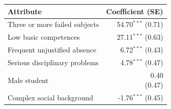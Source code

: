\begin{tabular}{lr}
\toprule
Attribute & Coefficient (SE) \\
\midrule
Three or more failed subjects & \shortstack{54.70$^{***}$\\{\scriptsize (0.71)}} \\
Low basic competences & \shortstack{27.11$^{***}$\\{\scriptsize (0.63)}} \\
Frequent unjustified absence & \shortstack{6.72$^{***}$\\{\scriptsize (0.43)}} \\
Serious disciplinary problems & \shortstack{4.78$^{***}$\\{\scriptsize (0.47)}} \\
Male student & \shortstack{0.40\\{\scriptsize (0.47)}} \\
Complex social background & \shortstack{-1.76$^{***}$\\{\scriptsize (0.45)}} \\
\bottomrule
\end{tabular}

